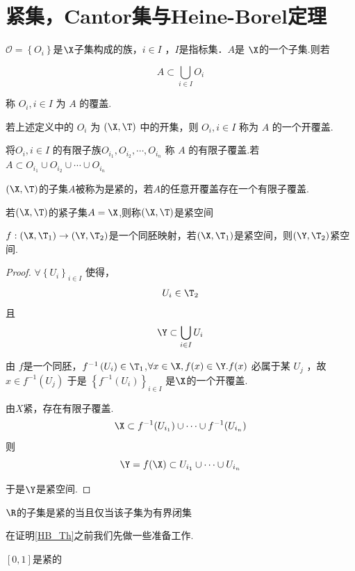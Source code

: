 \section{紧集，Cantor集与Heine-Borel定理}
\begin{definition}
	$\mathcal{O}=\left\{O_i\right\}$是$\X$子集构成的族，$i \in I$ ，$I$是指标集．$A$是 $\X$的一个子集.则若
	
	$$
	A \subset \bigcup_{i \in I} O_i
	$$
	
	
	称 $O_i, i \in I$ 为 $A$ 的覆盖.
	
	若上述定义中的 $O_i$ 为 $(\X, \T)$ 中的开集，则 $O_i, i \in I$ 称为 $A$ 的一个开覆盖.
	
	将$O_i, i \in I$ 的有限子族$O_{i_1}, O_{i_2}, \cdots, O_{i_n}$  称 $A$ 的有限子覆盖.若 $A \subset O_{i_1} \cup O_{i_2} \cup \cdots \cup O_{i_n}$
\end{definition}
\begin{definition}
	$(\X,\T)$的子集$A$被称为是紧的，若$A$的任意开覆盖存在一个有限子覆盖.
	
	若$(\X,\T)$的紧子集$A=\X$,则称$(\X,\T)$是紧空间
\end{definition}
\begin{proposition}
	$f:(\X,\T_1)\rightarrow(\Y,\T_2)$是一个同胚映射，若$(\X,\T_1)$是紧空间，则$(\Y,\T_2)$紧空间.
\end{proposition}
\begin{proof}
	$\forall\left\{U_i\right\}_{i\in I}$ 使得，
	$$U_i \in \T_2$$且 $$\Y \subset \bigcup_{i \in I} U_i$$
	
	由 $f$是一个同胚，$f^{-1}\left(U_i\right) \in \T_1$,$\forall x \in \X, f(x) \in \Y . f(x)$ 必属于某 $U_j$ ，故 $x \in f^{-1}\left(U_j\right)$
	于是 $\left\{f^{-1}\left(U_i\right)\right\}_{i \in I}$ 是$\X$的一个开覆盖.
	
	由$X$紧，存在有限子覆盖.
	$$\X\subset f^{-1}(U_{i_{1}})\cup\cdots\cup f^{-1}(U_{i_{n}})$$
	则
	$$\Y=f(\X)\subset U_{i_{1}}\cup\cdots\cup U_{i_{n}}$$
	
	
	于是$\Y$是紧空间.
	
\end{proof}
\begin{theorem}\label{HB_Th}
	$\R$的子集是紧的当且仅当该子集为有界闭集
\end{theorem}
在证明\ref{HB_Th}之前我们先做一些准备工作.
\begin{proposition}
	$\left[0,1\right]$是紧的
\end{proposition}
